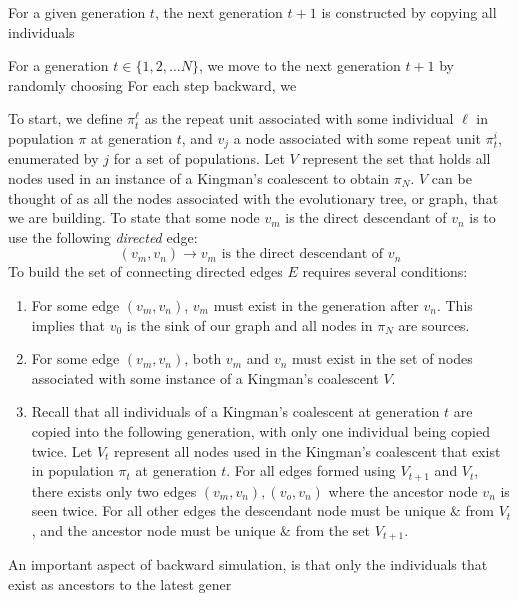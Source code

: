For a given generation $t$, the next generation $t + 1$ is constructed by copying all individuals



For a generation $t \in \{ 1, 2, \ldots N \}$, we move to the next generation $t + 1$ by randomly choosing
For each step backward, we

To start, we define $\pi_t^{\ell}$ as the repeat unit associated with some individual $\ell$ in population $\pi$ at
generation $t$, and $v_j$ a node associated with some repeat unit $\pi_t^i$, enumerated by $j$ for a set of
populations.
Let $V$ represent the set that holds all nodes used in an instance of a Kingman's coalescent to obtain $\pi_N$.
$V$ can be thought of as all the nodes associated with the evolutionary tree, or graph, that we are building.
To state that some node $v_m$ is the direct descendant of $v_n$ is to use the following \emph{directed} edge:
\begin{equation}
    (v_m, v_n) \rightarrow v_m \text{ is the direct descendant of } v_n
\end{equation}
To build the set of connecting directed edges $E$ requires several conditions:
\begin{enumerate}
    \item For some edge $(v_m, v_n)$, $v_m$ must exist in the generation after $v_n$.
        This implies that $v_0$ is the sink of our graph and all nodes in $\pi_N$ are sources.
    \item For some edge $(v_m, v_n)$, both $v_m$ and $v_n$ must exist in the set of nodes associated with some instance
        of a Kingman's coalescent $V$.
    \item Recall that all individuals of a Kingman's coalescent at generation $t$ are copied into the following
        generation, with only one individual being copied twice.
        Let $V_t$ represent all nodes used in the Kingman's coalescent that exist in population $\pi_t$ at generation
        $t$.
        For all edges formed using $V_{t+1}$ and $V_{t}$, there exists only two edges $(v_m, v_n), (v_o, v_n)$ where
        the ancestor node $v_n$ is seen twice.
        For all other edges the descendant node must be unique \& from $V_t$, and the ancestor node must be unique \&
        from the set $V_{t+1}$.
\end{enumerate}



An important aspect of backward simulation, is that only the individuals that exist as ancestors to the latest
gener

